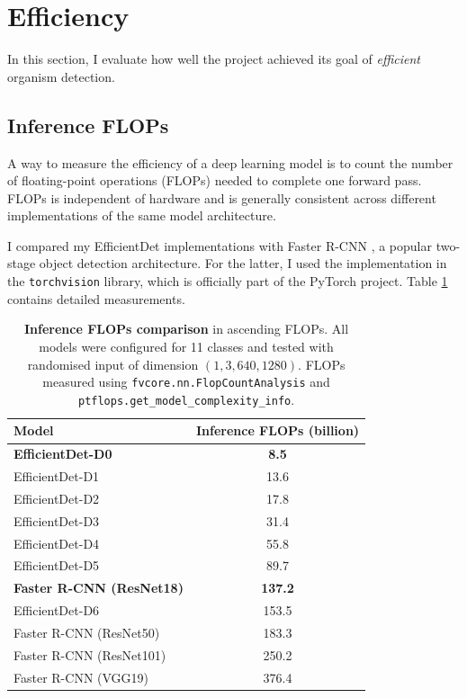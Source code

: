 \documentclass[12pt,a4paper,twoside,openany]{report}
\begin{document}
\section{Efficiency} \label{section:efficiency}
In this section, I evaluate how well the project achieved its goal of \textit{efficient} organism detection. 

\subsection{Inference FLOPs}
A way to measure the efficiency of a deep learning model is to count the number of floating-point operations (FLOPs) needed to complete one forward pass. FLOPs is independent of hardware and is generally consistent across different implementations of the same model architecture.

I compared my EfficientDet implementations with Faster R-CNN \cite{ren_faster_2016}, a popular two-stage object detection architecture. For the latter, I used the implementation in the \verb|torchvision| library, which is officially part of the PyTorch project. Table \ref{table:flops} contains detailed measurements. 

\begin{table}[H]
    \centering
    \begin{tabular}{|l c|}
        \hline
        \textbf{Model}  &  \textbf{Inference FLOPs (billion)} \\
        \hline
        \textbf{EfficientDet-D0} & \textbf{8.5}\\
        EfficientDet-D1 & 13.6\\
        EfficientDet-D2 & 17.8\\
        EfficientDet-D3 & 31.4\\
        EfficientDet-D4 & 55.8\\
        EfficientDet-D5 & 89.7\\
        \textbf{Faster R-CNN (ResNet18)} & \textbf{137.2}\\
        EfficientDet-D6 & 153.5\\
        Faster R-CNN (ResNet50) & 183.3\\
        Faster R-CNN (ResNet101) & 250.2\\
        Faster R-CNN (VGG19) & 376.4\\
        \hline
    \end{tabular}
    \cprotect\caption{\textbf{Inference FLOPs comparison} in ascending FLOPs. All models were configured for 11 classes and tested with randomised input of dimension $(1, 3, 640, 1280)$. FLOPs measured using \verb|fvcore.nn.FlopCountAnalysis| and \verb|ptflops.get_model_complexity_info|.}
    \label{table:flops}
\end{table}
\end{document}
